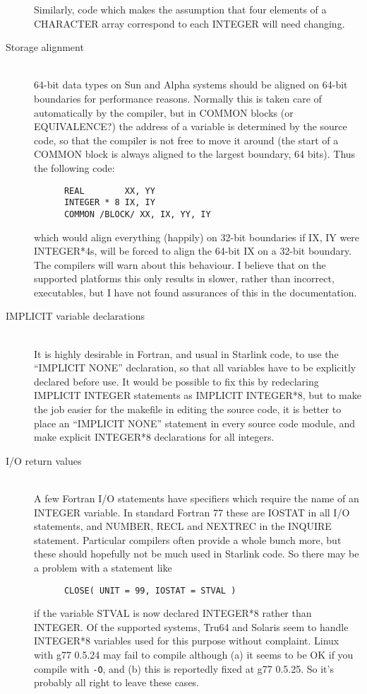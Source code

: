\documentclass[twoside,11pt]{article}
\renewcommand{\_}{\texttt{\symbol{95}}}
\begin{document}
\begin{description}
Similarly, code which makes the assumption that four elements of
a CHARACTER array correspond to each INTEGER will need changing.
%
\item[Storage alignment]\mbox{}
\\
64-bit data types on Sun and Alpha systems should be aligned on 
64-bit boundaries for performance reasons.
Normally this is taken care of automatically by the compiler, 
but in COMMON blocks (or EQUIVALENCE?) the address of a 
variable is determined by the source code, so that the compiler
is not free to move it around (the start of a COMMON block is
always aligned to the largest boundary, 64 bits).
Thus the following code:
\begin{squote}
\begin{verbatim}
      REAL        XX, YY
      INTEGER * 8 IX, IY
      COMMON /BLOCK/ XX, IX, YY, IY
\end{verbatim}
\end{squote}
which would align everything (happily) on 32-bit boundaries if IX, IY
were INTEGER*4s, will be forced to align the 64-bit IX on a 32-bit
boundary.
The compilers will warn about this behaviour.
I believe that on the supported platforms this only 
results in slower, rather than incorrect, executables, 
but I have not found assurances of this in the documentation.
%
\item[IMPLICIT variable declarations]\mbox{}
\\
It is highly desirable in Fortran, and usual in Starlink code, to use
the ``IMPLICIT NONE'' declaration, so that all variables have to be
explicitly declared before use.
It would be possible to fix this by redeclaring IMPLICIT INTEGER
statements as IMPLICIT INTEGER*8, but to make the job easier for
the makefile in editing the source code, it is better to place
an ``IMPLICIT NONE'' statement in every source code module, and
make explicit INTEGER*8 declarations for all integers.
%
\item[I/O return values]\mbox{}
\\
A few Fortran I/O statements have specifiers which require the name
of an INTEGER variable.  In standard Fortran 77 these are 
IOSTAT in all I/O statements, and 
NUMBER, RECL and NEXTREC in the INQUIRE statement.
Particular compilers often provide a whole bunch more, but these
should hopefully not be much used in Starlink code.
So there may be a problem with a statement like
\begin{squote}
\begin{verbatim}
      CLOSE( UNIT = 99, IOSTAT = STVAL )
\end{verbatim}
\end{squote}
if the variable STVAL is now declared INTEGER*8 rather than INTEGER.
Of the supported systems, Tru64 and Solaris seem to handle 
INTEGER*8 variables used for this purpose without complaint.
Linux with g77 0.5.24 may fail to compile although (a) it seems to
be OK if you compile with {\tt -O}, and (b) this is reportedly
fixed at g77 0.5.25.  So it's probably all right to leave these cases.
%
\end{description}
\end{document}
